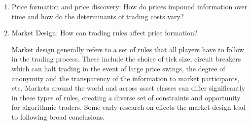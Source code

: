 \begin{enumerate}[--]
\item Price formation and price discovery: How do prices impound information over time and how do the determinants of trading costs vary?

\item Market Design: How can trading rules affect price formation? 

Market design generally refers to a set of rules that all players have to follow in the trading process. These include the choice of tick size, circuit breakers\label{in:circ_br} which can halt trading in the event of large price swings, the degree of anonymity and the transparency of the information to market participants, etc. Markets around the world and across asset classes can differ significantly in these types of rules, creating a diverse set of constraints and opportunity for algorithmic traders. Some early research on effects the market design lead to following broad conclusions.



\end{enumerate}
